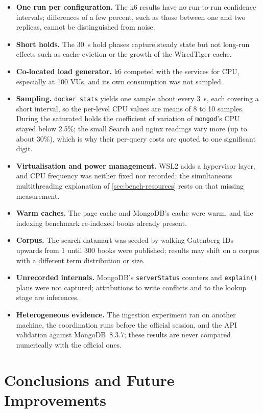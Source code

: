 \documentclass[10pt,a4paper]{article}
\newcommand{\code}[1]{\texttt{#1}}
\begin{document}
\begin{itemize}
  \item \textbf{One run per configuration.} The k6 results have no
  run-to-run confidence intervals; differences of a few percent, such as those
  between one and two replicas, cannot be distinguished from noise.
  \item \textbf{Short holds.} The 30~s hold phases capture steady state but
  not long-run effects such as cache eviction or the growth of the WiredTiger
  cache.
  \item \textbf{Co-located load generator.} k6 competed with the services for
  CPU, especially at 100 VUs, and its own consumption was not sampled.
  \item \textbf{Sampling.} \code{docker stats} yields one sample about every
  3~s, each covering a short interval, so the per-level CPU values are means
  of 8 to 10 samples. During the saturated holds the coefficient of variation
  of \code{mongod}'s CPU stayed below 2.5\%; the small Search and nginx
  readings vary more (up to about 30\%), which is why their per-query costs are
  quoted to one significant digit.
  \item \textbf{Virtualisation and power management.} WSL2 adds a hypervisor
  layer, and CPU frequency was neither fixed nor recorded; the simultaneous
  multithreading explanation of \cref{sec:bench-resources} rests on that
  missing measurement.
  \item \textbf{Warm caches.} The page cache and MongoDB's cache were warm,
  and the indexing benchmark re-indexed books already present.
  \item \textbf{Corpus.} The search datamart was seeded by walking Gutenberg
  IDs upwards from 1 until 300 books were published; results may shift on a
  corpus with a different term distribution or size.
  \item \textbf{Unrecorded internals.} MongoDB's \code{serverStatus} counters
  and \code{explain()} plans were not captured; attributions to write conflicts
  and to the lookup stage are inferences.
  \item \textbf{Heterogeneous evidence.} The ingestion experiment ran on
  another machine, the coordination runs before the official session, and the
  API validation against MongoDB~8.3.7; these results are never compared
  numerically with the official ones.
\end{itemize}

\section{Conclusions and Future Improvements}
\label{sec:conclusions}
\end{document}
